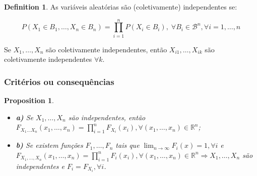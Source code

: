 \documentclass[
]{article}
\providecommand{\tightlist}{%
  \setlength{\itemsep}{0pt}\setlength{\parskip}{0pt}}
\newtheorem{proposition}{Proposition}[section]
\theoremstyle{definition}
\newtheorem{definition}{Definition}[section]
\theoremstyle{definition}
\theoremstyle{definition}
\theoremstyle{definition}
\theoremstyle{remark}
\begin{document}
\begin{definition}
As variáveis aleatórias são (coletivamente) independentes se:

\begin{equation*}
P(X_{1} \in B_{1}, \ldots, X_{n} \in B_{n}) = \prod_{i=1}^{n}P(X_{i} \in B_{i}), \; \forall B_{i} \in \mathcal{B}^{n}, \forall i = 1, \ldots, n
\end{equation*}
\end{definition}

Se \(X_{1},\ldots,X_{n}\) são coletivamente independentes, então \(X_{i1},\ldots,X_{ik}\) são coletivamente independentes \(\forall k\).

\hypertarget{crituxe9rios-ou-consequuxeancias}{%
\subsubsection{Critérios ou consequências}\label{crituxe9rios-ou-consequuxeancias}}

\begin{proposition}
\protect\hypertarget{prp:propacumulada}{}\label{prp:propacumulada}\leavevmode

\begin{itemize}
\tightlist
\item
  \textbf{a)} Se \(X_{1},\ldots,X_{n}\) são independentes, então \(F_{X_{1} \ldots X_{n}}(x_{1},\ldots,x_{n}) = \prod_{i=1}^{n}F_{X_{i}}(x_{i}),\forall (x_{1},\ldots,x_{n}) \in \mathbb{R}^{n}\);
\item
  \textbf{b)} Se existem funções \(F_{1},\ldots,F_{n}\) tais que \(\lim_{n \to \infty}F_{i}(x) = 1, \forall i\) e \(F_{X_{1},\ldots,X_{n}}(x_{1},\ldots,x_{n}) = \prod_{i=1}^{n}F_{i}(x_{i}), \forall (x_{1},\ldots,x_{n}) \in \mathbb{R}^{n} \Rightarrow X_{1},\ldots, X_{n}\) são independentes e \(F_{i} = F_{X_{i}}, \forall i\).
\end{itemize}

\end{proposition}
\end{document}
